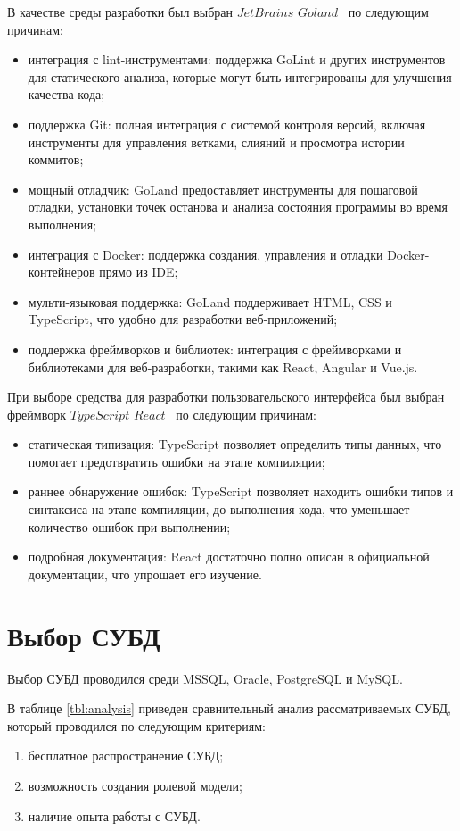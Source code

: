 В качестве среды разработки был выбран $JetBrains$ $Goland$~\cite{goland} по следующим причинам:
\begin{itemize}
	\item интеграция с lint-инструментами: поддержка GoLint и других инструментов для статического анализа, которые могут быть интегрированы для улучшения качества кода;
	\item поддержка Git: полная интеграция с системой контроля версий, включая инструменты для управления ветками, слияний и просмотра истории коммитов;
	\item мощный отладчик: GoLand предоставляет инструменты для пошаговой отладки, установки точек останова и анализа состояния программы во время выполнения;
	\item интеграция с Docker: поддержка создания, управления и отладки Docker-контейнеров прямо из IDE;
	\item мульти-языковая поддержка: GoLand поддерживает HTML, CSS и TypeScript, что удобно для разработки веб-приложений;
	\item поддержка фреймворков и библиотек: интеграция с фреймворками и библиотеками для веб-разработки, такими как React, Angular и Vue.js.

\end{itemize}

При выборе средства для разработки пользовательского интерфейса был выбран фреймворк $TypeScript$ $React$~\cite{tsreact} по следующим причинам:
\begin{itemize}
	\item статическая типизация: TypeScript позволяет определить типы данных, что помогает предотвратить ошибки на этапе компиляции;
	\item раннее обнаружение ошибок: TypeScript позволяет находить ошибки типов и синтаксиса на этапе компиляции, до выполнения кода, что уменьшает количество ошибок при выполнении;
	\item подробная документация: React достаточно полно описан в официальной документации, что упрощает его изучение.
\end{itemize}

\newpage
\section{Выбор СУБД}

Выбор СУБД проводился среди MSSQL, Oracle, PostgreSQL и MySQL.

В таблице \ref{tbl:analysis} приведен сравнительный анализ рассматриваемых СУБД, который проводился по следующим критериям:
\begin{enumerate}
	\item бесплатное распространение СУБД;
	\item возможность создания ролевой модели;
	\item наличие опыта работы с СУБД.
\end{enumerate}

